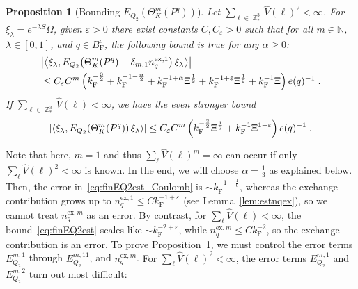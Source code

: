 \documentclass[12pt,a4paper]{article}
\numberwithin{equation}{section}
\newcommand{\NNN}{\mathbb{N}}
\newcommand{\1}{\mathbb{I}}
\newcommand{\ex}{\mathrm{ex}}
\newcommand{\F}{\mathrm{F}}
\DeclareMathOperator{\Z}{\mathbb{Z}}
\newcommand{\half}{\frac{1}{2}}
\newcommand{\eva}[1]{\left\langle #1 \right\rangle}
\theoremstyle{plain}
\newtheorem{proposition}[theorem]{Proposition}
\theoremstyle{definition}
\theoremstyle{remark}
\theoremstyle{plain}
\theoremstyle{definition}
\theoremstyle{remark}
\begin{document}
\begin{proposition}[Bounding $E_{Q_2}(\Theta^m_{K}(P^q))$]\label{prop:finEQ2est}
Let $ \sum_{\ell \in \Z^3_*} \hat{V}(\ell)^2 < \infty $. For $\xi_\lambda = e^{-\lambda S} \Omega$, given $ \varepsilon > 0 $ there exist constants $ C, C_\varepsilon > 0 $ such that for all $ m \in \NNN $, $ \lambda \in [0,1] $, and $ q \in B_{\F}^c $, the following bound is true for any $ \alpha \ge 0 $:
\begin{equation}\label{eq:finEQ2est_Coulomb}
\begin{aligned}
	&\abs{\eva{\xi_\lambda, E_{Q_2}\!\left(\Theta^m_K(P^q)- \delta_{m,1} n_q^{\ex,1} \right) \xi_\lambda}} \\
	&\leq C_\varepsilon C^m \left( k_{\F}^{-\frac 32} 
		+ k_{\F}^{-1 - \frac{\alpha}{2}} 
		+ k_{\F}^{-1+\alpha} \Xi^\half
		+ k_{\F}^{-1+\varepsilon} \Xi^\half
		+ k_{\F}^{-1} \Xi \right) e(q)^{-1} \;. \\
\end{aligned}
\end{equation}
If $ \sum_{\ell \in \Z^3_*} \hat{V}(\ell) < \infty $, we have the even stronger bound
\begin{equation}\label{eq:finEQ2est}
	\abs{\eva{\xi_\lambda, E_{Q_2}\!\left(\Theta^m_K(P^q)\right) \xi_\lambda}} 
	\leq C_\varepsilon C^m \left( k_{\F}^{-\frac{3}{2}} \Xi^\half
		+ k_{\F}^{-1} \Xi^{1-\varepsilon} \right) e(q)^{-1} \;. \\
\end{equation}
\end{proposition}

\textcolor{green!30!black}{Note that here, $ m = 1 $ and thus $ \sum_\ell \hat{V}(\ell)^m = \infty $ can occur if only $ \sum_\ell \hat{V}(\ell)^2 < \infty $ is known. In the end, we will choose $ \alpha = \frac 13 $ as explained below. Then, the error in~\eqref{eq:finEQ2est_Coulomb} is $ \sim k_{\F}^{-1-\frac 16} $, whereas the exchange contribution grows up to $ n_q^{\ex,1} \le C k_{\F}^{-1 + \varepsilon} $ (see Lemma~\ref{lem:estnqex}), so we cannot treat $ n_q^{\ex,m} $ as an error. By contrast, for $ \sum_\ell \hat{V}(\ell) < \infty $, the bound~\eqref{eq:finEQ2est} scales like $ \sim k_{\F}^{-2+\varepsilon} $, while $ n_q^{\ex,m} \le C k_{\F}^{-2} $, so the exchange contribution is an error.} To prove Proposition~\ref{prop:finEQ2est}, we must control the error terms $ E^{m,1}_{Q_2} $ through $ E^{m,11}_{Q_2} $, and $ n_q^{\ex,m} $. \textcolor{green!30!black}{For $ \sum_\ell \hat{V}(\ell)^2 < \infty $, the error terms $ E^{m,1}_{Q_2} $ and $ E^{m,2}_{Q_2} $ turn out most difficult:}
\end{document}
